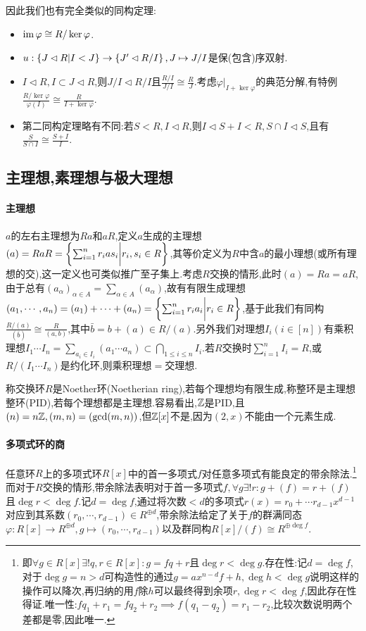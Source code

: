 \documentclass[11pt]{article} %
\begin{document}
因此我们也有完全类似的同构定理:
\begin{itemize}
    \item $\operatorname{im} \varphi\cong R/\ker \varphi$.
    \item $u:\left\{J\lhd R|I<J\right\}\to \left\{J'\lhd R/I\right\}, J\mapsto J/I$是保(包含)序双射.
    \item $I\lhd R, I\subset J\lhd R$,则$J/I\lhd R/I$且$\frac{R/I}{J/I}\cong \frac{R}{J}$.考虑$\varphi|_{I+\ker\varphi}$的典范分解,有特例$\frac{R/\ker\varphi}{\varphi(I)}\cong\frac{R}{I+\ker\varphi}$.
    \item 第二同构定理略有不同:若$S<R,I\lhd R$,则$I\lhd S+I<R, S\cap I\lhd S$,且有$\frac{S}{S\cap I}\cong \frac{S+I}{I}$.
\end{itemize}

\subsection{主理想,素理想与极大理想}
\paragraph{主理想}
$a$的左右主理想为$Ra$和$aR$,定义$a$生成的主理想$(a)=RaR=\left\{\sum_{i=1}^n r_ias_i\bigg| r_i,s_i\in R\right\}$,其等价定义为$R$中含$a$的最小理想(或所有理想的交),这一定义也可类似推广至子集上.考虑$R$交换的情形,此时$(a)=Ra=aR$,由于总有$(a_{\alpha})_{\alpha\in A}=\sum_{\alpha\in A}(a_{\alpha})$,故有有限生成理想$(a_1,\cdots,a_n)=(a_1)+\cdots+(a_n)=\left\{\sum_{i=1}^n r_ia_i\bigg| r_i\in R\right\}$,基于此我们有同构$\frac{R/(a)}{(\bar{b})}\cong \frac{R}{(a,b)}$,其中$\bar{b}=b+(a)\in R/(a)$.另外我们对理想$I_i(i\in [n])$有乘积理想$I_1\cdots I_n=\sum_{a_i\in I_i}(a_1\cdots a_n)\subset \bigcap_{1\leq i\leq n}I_i$.若$R$交换时$\sum_{i=1}^n I_i=R$,或$R/(I_1\cdots I_n)$是约化环,则乘积理想$=$交理想.

称交换环$R$是Noether环(Noetherian ring),若每个理想均有限生成,称整环是主理想整环(PID),若每个理想都是主理想.容易看出,$\mathbb{Z}$是PID,且$(n)=n\mathbb{Z}, (m,n)=(\gcd(m,n))$,但$\mathbb{Z}[x]$不是,因为$(2,x)$不能由一个元素生成.

\paragraph{多项式环的商}
任意环$R$上的多项式环$R[x]$中的首一多项式$f$对任意多项式有能良定的带余除法.\footnote{即$\forall g\in R[x]\exists! q,r\in R[x]: g=fq+r$且$\deg r<\deg g$.存在性:记$d=\deg f$,对于$\deg g=n>d$可构造性的通过$g=ax^{n-d}f+h, \deg h<\deg g$说明这样的操作可以降次,再归纳的用$f$除$h$可以最终得到余项$r, \deg r<\deg f$,因此存在性得证.唯一性:$fq_1+r_1=fq_2+r_2\implies f(q_1-q_2)=r_1-r_2$,比较次数说明两个差都是零,因此唯一.}而对于$R$交换的情形,带余除法表明对于首一多项式$f, \forall g\exists! r: g+(f)=r+(f)$且$\deg r<\deg f$.记$d=\deg f$,通过将次数$<d$的多项式$r(x)=r_0+\cdots r_{d-1}x^{d-1}$对应到其系数$(r_0,\cdots,r_{d-1})\in R^{\oplus d}$,带余除法给定了关于$f$的群满同态$\varphi:R[x]\to R^{\oplus d}, g\mapsto (r_0,\cdots ,r_{d-1})$以及群同构$R[x]/(f)\cong R^{\oplus \deg f}$.
\end{document}
